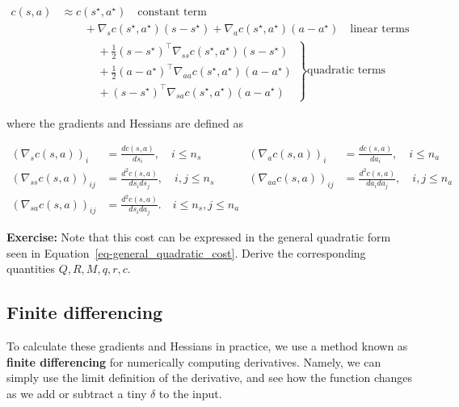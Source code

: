 \documentclass[
  letterpaper,
  DIV=11,
  numbers=noendperiod]{scrreprt}
\theoremstyle{plain}
\theoremstyle{plain}
\theoremstyle{definition}
\theoremstyle{definition}
\theoremstyle{remark}
\begin{document}
\[
\begin{aligned}
    c(s, a) & \approx c(s^\star, a^\star) \quad \text{constant term}                                                                                      \\
                 & \qquad + \nabla_sc(s^\star, a^\star) (s- s^\star) + \nabla_ac(s^\star, a^\star) (a - a^\star) \quad \text{linear terms} \\
                 & \left. \begin{aligned}
                               & \qquad + \frac{1}{2} (s- s^\star)^\top \nabla_{ss} c(s^\star, a^\star) (s- s^\star)       \\
                               & \qquad + \frac{1}{2} (a- a^\star)^\top \nabla_{aa} c(s^\star, a^\star) (a- a^\star) \\
                               & \qquad + (s- s^\star)^\top \nabla_{sa} c(s^\star, a^\star) (a- a^\star)
                          \end{aligned} \right\} \text{quadratic terms}
\end{aligned}
\]

where the gradients and Hessians are defined as

\[
\begin{aligned}
    (\nabla_sc(s, a))_{i}         & = \frac{d c(s, a)}{d s_i}, \quad i \le n_s
                                          & (\nabla_ac(s, a))_{i}                                               & = \frac{d c(s, a)}{d a_i}, \quad i \le n_a\\
    (\nabla_{ss} c(s, a))_{ij}  & = \frac{d^2 c(s, a)}{d s_i d s_j}, \quad i, j \le n_s
                                          & (\nabla_{aa} c(s, a))_{ij}                                       & = \frac{d^2 c(s, a)}{d a_i d a_j}, \quad i, j \le n_a\\
    (\nabla_{sa} c(s, a))_{ij} & = \frac{d^2 c(s, a)}{d s_i d a_j}. \quad i \le n_s, j \le n_a
\end{aligned}
\]

\textbf{Exercise:} Note that this cost can be expressed in the general
quadratic form seen in Equation~\ref{eq-general_quadratic_cost}. Derive
the corresponding quantities \(Q, R, M, q, r, c\).

\subsection{Finite differencing}\label{finite-differencing}

To calculate these gradients and Hessians in practice, we use a method
known as \textbf{finite differencing} for numerically computing
derivatives. Namely, we can simply use the limit definition of the
derivative, and see how the function changes as we add or subtract a
tiny \(\delta\) to the input.
\end{document}
